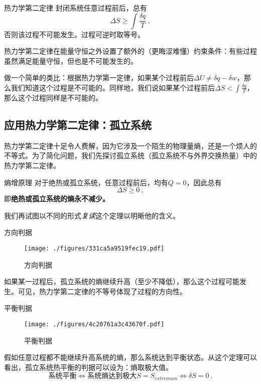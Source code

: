 \begin{theorem}{热力学第二定律}
封闭系统任意过程前后，总有
\begin{equation}
\Delta S \ge \int \frac{\delta q}{T}~,
\end{equation}
否则该过程不可能发生。过程可逆时取等号。
\end{theorem}
热力学第二定律在能量守恒之外设置了额外的（更晦涩难懂）约束条件：有些过程虽然满足能量守恒，但也是不可能发生的。

做一个简单的类比：根据热力学第一定律，如果某个过程前后$\Delta U \ne \delta q - \delta w$，那么我们知道这个过程是不可能的。同样地，我们说如果某个过程前后$\Delta S < \int \frac{\delta q}{T}$，那么这个过程同样是不可能的。

\subsection{应用热力学第二定律：孤立系统}
热力学第二定律十足令人费解，因为它涉及一个陌生的物理量熵，还是一个烦人的不等式。为了简化问题，我们先探讨孤立系统（孤立系统不与外界交换热量）中的热力学第二定律。
\begin{corollary}{熵增原理}
对于绝热或孤立系统，任意过程前后，均有$Q=0$，因此总有 $$\Delta S \ge 0~,$$
即\textbf{绝热或孤立系统的熵永不减少。}
\end{corollary}
我们再试图以不同的形式\textsl{复读}这个定理以明晰他的含义。

\begin{corollary}{方向判据}
\begin{figure}[ht]
\centering
\texttt{[image: ./figures/331ca5a9519fec19.pdf]}
\caption{方向判据} \label{fig_Td2Law_1}
\end{figure}
如果某一过程后，孤立系统的熵继续升高（至少不降低），那么这个过程可能发生。可见，热力学第二定律的不等号体现了过程的方向性。
\end{corollary}

\begin{corollary}{平衡判据}
\begin{figure}[ht]
\centering
\texttt{[image: ./figures/4c20761a3c43670f.pdf]}
\caption{平衡判据} \label{fig_Td2Law_2}
\end{figure}
假如任意过程都不能继续升高系统的熵，那么系统达到平衡状态。从这个定理可以看出，孤立系统热平衡的判据可以设为：熵取极大值。
$$\text{系统平衡} \Leftrightarrow \text{系统熵达到极大} S=S_{extremum} \Leftrightarrow \delta S = 0~.$$
\end{corollary}

